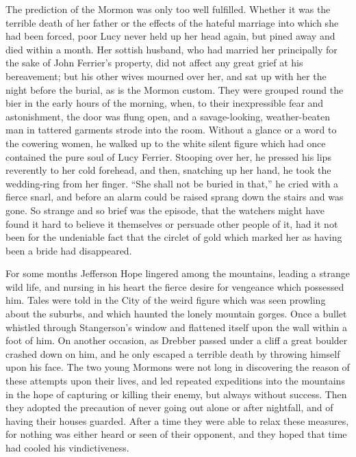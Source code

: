 \documentclass[12pt,english]{book}
\begin{document}
The prediction of the Mormon was only too well fulfilled. Whether
it was the terrible death of her father or the effects of the hateful
marriage into which she had been forced, poor Lucy never held up her
head again, but pined away and died within a month. Her sottish husband,
who had married her principally for the sake of John Ferrier's property,
did not affect any great grief at his bereavement; but his other wives
mourned over her, and sat up with her the night before the burial,
as is the Mormon custom. They were grouped round the bier in the early
hours of the morning, when, to their inexpressible fear and astonishment,
the door was flung open, and a savage-looking, weather-beaten man
in tattered garments strode into the room. Without a glance or a word
to the cowering women, he walked up to the white silent figure which
had once contained the pure soul of Lucy Ferrier. Stooping over her,
he pressed his lips reverently to her cold forehead, and then, snatching
up her hand, he took the wedding-ring from her finger. {}``She shall
not be buried in that,'' he cried with a fierce snarl, and before
an alarm could be raised sprang down the stairs and was gone. So strange
and so brief was the episode, that the watchers might have found it
hard to believe it themselves or persuade other people of it, had
it not been for the undeniable fact that the circlet of gold which
marked her as having been a bride had disappeared.

For some months Jefferson Hope lingered among the mountains, leading
a strange wild life, and nursing in his heart the fierce desire for
vengeance which possessed him. Tales were told in the City of the
weird figure which was seen prowling about the suburbs, and which
haunted the lonely mountain gorges. Once a bullet whistled through
Stangerson's window and flattened itself upon the wall within a foot
of him. On another occasion, as Drebber passed under a cliff a great
boulder crashed down on him, and he only escaped a terrible death
by throwing himself upon his face. The two young Mormons were not
long in discovering the reason of these attempts upon their lives,
and led repeated expeditions into the mountains in the hope of capturing
or killing their enemy, but always without success. Then they adopted
the precaution of never going out alone or after nightfall, and of
having their houses guarded. After a time they were able to relax
these measures, for nothing was either heard or seen of their opponent,
and they hoped that time had cooled his vindictiveness.
\end{document}
